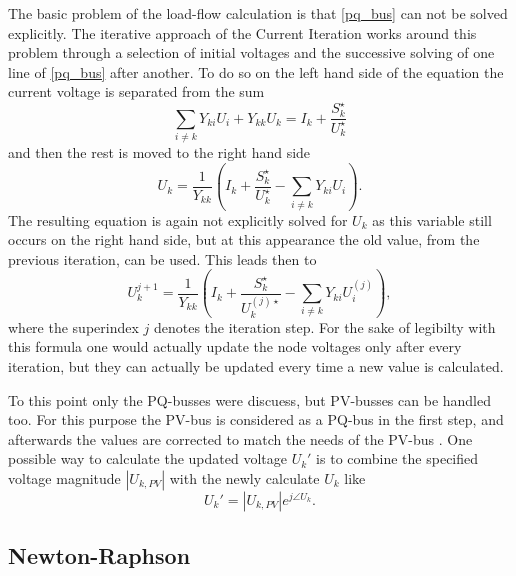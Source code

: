 The basic problem of the load-flow calculation is that \eqref{pq_bus} can not be solved explicitly. The iterative approach of the Current Iteration works around this problem through a selection of initial voltages and the successive solving of one line of \eqref{pq_bus} after another. To do so on the left hand side of the equation the current voltage is separated from the sum
\begin{equation}
	\sum_{i \ne k} Y_{ki} U_i + Y_{kk} U_k = I_k + \frac{S_k^\star}{U_k^\star}
\end{equation}
and then the rest is moved to the right hand side
\begin{equation}
	 U_k = \frac{1}{Y_{kk}} \left( I_k + \frac{S_k^\star}{U_k^\star} - \sum_{i \ne k} Y_{ki} U_i \right).
\end{equation}
The resulting equation is again not explicitly solved for $U_k$ as this variable still occurs on the right hand side, but at this appearance the old value, from the previous iteration, can be used. This leads then to
\begin{equation}
	 U_k^{j + 1} = \frac{1}{Y_{kk}} \left( I_k + \frac{S_k^\star}{U_k^{(j) \star}} - \sum_{i \ne k} Y_{ki} U_i^{(j)} \right),
\end{equation}
where the superindex $j$ denotes the iteration step. For the sake of legibilty with this formula one would actually update the node voltages only after every iteration, but they can actually be updated every time a new value is calculated.

To this point only the PQ-busses were discuess, but PV-busses can be handled too. For this purpose the PV-bus is considered as a PQ-bus in the first step, and afterwards the values are corrected to match the needs of the PV-bus \citep[p. 211]{powerSystemAnalysis}. One possible way to calculate the updated voltage $U_k'$ is to combine the specified voltage magnitude $|U_{k,PV}|$ with the newly calculate $U_k$ like
\begin{equation}
	U_k' = |U_{k,PV}| e^{j \angle U_k}.
\end{equation}

\subsection{Newton-Raphson}
\label{sec:newton_raphson}


